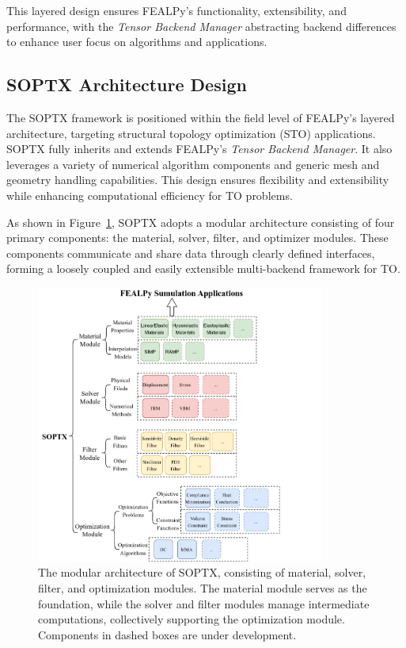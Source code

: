 \documentclass[mathpazo]{cicp}
\begin{document}
This layered design ensures FEALPy’s functionality, extensibility, and performance, with the \textit{Tensor Backend Manager} abstracting backend differences to enhance user focus on algorithms and applications.

\subsection{SOPTX Architecture Design}
The SOPTX framework is positioned within the field level of FEALPy’s layered architecture, targeting structural topology optimization (STO) applications. SOPTX fully inherits and extends FEALPy’s \textit{Tensor Backend Manager}. It also leverages a variety of numerical algorithm components and generic mesh and geometry handling capabilities. This design ensures flexibility and extensibility while enhancing computational efficiency for TO problems.

As shown in Figure~\ref{fs:fig2}, SOPTX adopts a modular architecture consisting of four primary components: the material, solver, filter, and optimizer modules. These components communicate and share data through clearly defined interfaces, forming a loosely coupled and easily extensible multi-backend framework for TO.
\begin{figure}[!htb]
	\centering
	\includegraphics[width=0.85\textwidth]{figures/soptx_structure.png}
	\caption{The modular architecture of SOPTX, consisting of material, solver, filter, and optimization modules. The material module serves as the foundation, while the solver and filter modules manage intermediate computations, collectively supporting the optimization module. Components in dashed boxes are under development.}
	\label{fs:fig2}
\end{figure}
\end{document}
